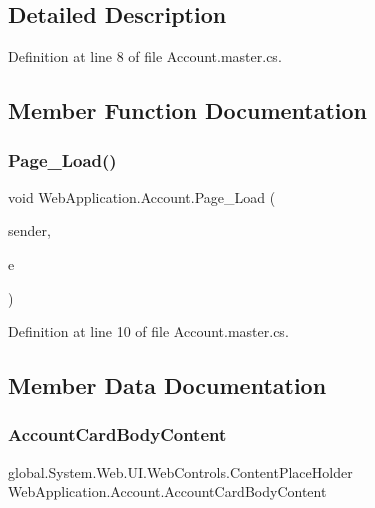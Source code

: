 \subsection{Detailed Description}


Definition at line 8 of file Account.\+master.\+cs.



\subsection{Member Function Documentation}
\mbox{\label{classWebApplication_1_1Account_ae857a22942da6ad8aaaa0022dd7a5c78}} 
\subsubsection{\texorpdfstring{Page\_Load()}{Page\_Load()}}
{\footnotesize\ttfamily void Web\+Application.\+Account.\+Page\+\_\+\+Load (\begin{DoxyParamCaption}\item[{object}]{sender,  }\item[{Event\+Args}]{e }\end{DoxyParamCaption})\hspace{0.3cm}{\ttfamily [protected]}}



Definition at line 10 of file Account.\+master.\+cs.



\subsection{Member Data Documentation}
\mbox{\label{classWebApplication_1_1Account_ad4d7bdd1cdc63398539ccec0bac3b7fa}} 
\subsubsection{\texorpdfstring{AccountCardBodyContent}{AccountCardBodyContent}}
{\footnotesize\ttfamily global.\+System.\+Web.\+U\+I.\+Web\+Controls.\+Content\+Place\+Holder Web\+Application.\+Account.\+Account\+Card\+Body\+Content\hspace{0.3cm}{\ttfamily [protected]}}




